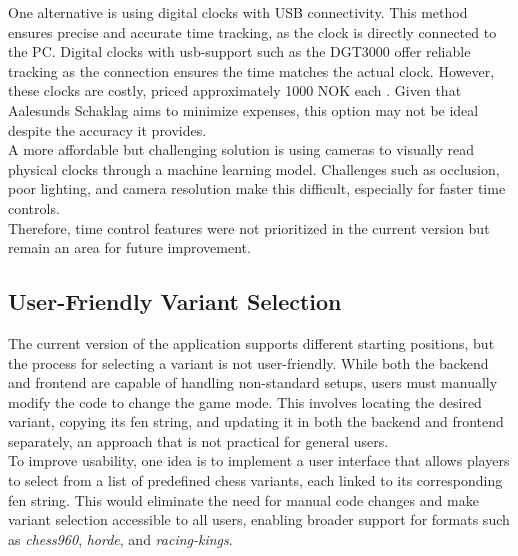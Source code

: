 One alternative is using digital clocks with USB connectivity. This method ensures precise and accurate time tracking, as the clock is directly connected to the PC. Digital clocks with \gls{usb}-support such as the DGT3000 offer reliable tracking as the connection ensures the time matches the actual clock. However, these clocks are costly, priced approximately 1000 NOK each \cite{sjakkbutikken:dgt-clock}. Given that Aalesunds Schaklag aims to minimize expenses, this option may not be ideal despite the accuracy it provides. \\

A more affordable but challenging solution is using cameras to visually read physical clocks through a machine learning model. Challenges such as occlusion, poor lighting, and camera resolution make this difficult, especially for faster time controls. \\

Therefore, time control features were not prioritized in the current version but remain an area for future improvement.


\subsection{User-Friendly Variant Selection}
The current version of the application supports different starting positions, but the process for selecting a variant is not user-friendly. While both the backend and frontend are capable of handling non-standard setups, users must manually modify the code to change the game mode. This involves locating the desired variant, copying its \gls{fen} string, and updating it in both the backend and frontend separately, an approach that is not practical for general users. \\

To improve usability, one idea is to implement a user interface that allows players to select from a list of predefined chess variants, each linked to its corresponding \gls{fen} string. This would eliminate the need for manual code changes and make variant selection accessible to all users, enabling broader support for formats such as \textit{\gls{chess960}}, \textit{\gls{horde}}, and \textit{\gls{racing-kings}}.